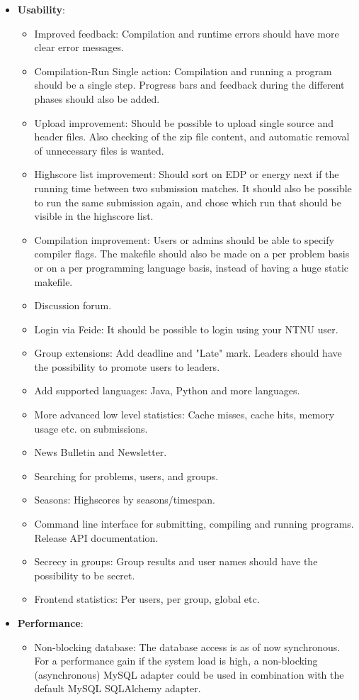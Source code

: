 \begin{itemize}
\item \textbf{Usability}:
    \begin{itemize}
        \item Improved feedback: Compilation and runtime errors should have more clear error messages.
        \item Compilation-Run Single action: Compilation and running a program should be a single step. Progress bars and feedback during the different phases should also be added.
        \item Upload improvement: Should be possible to upload single source and header files. Also checking of the zip file content, and automatic removal of unnecessary files is wanted.
        \item Highscore list improvement: Should sort on EDP or energy next if the running time between two submission matches. It should also be possible to run the same submission again, and chose which run that should be visible in the highscore list.
        \item Compilation improvement: Users or admins should be able to specify compiler flags. The makefile should also be made on a per problem basis or on a per programming language basis, instead of having a huge static makefile.
        \item Discussion forum.
        \item Login via Feide: It should be possible to login using your NTNU user.
        \item Group extensions: Add deadline and "Late" mark. Leaders should have the possibility to promote users to leaders.
        \item Add supported languages: Java, Python and more languages.
        \item More advanced low level statistics: Cache misses, cache hits, memory usage etc. on submissions.
        \item News Bulletin and Newsletter.
        \item Searching for problems, users, and groups.
        \item Seasons: Highscores by seasons/timespan.
        \item Command line interface for submitting, compiling and running programs. Release API documentation.
        \item Secrecy in groups: Group results and user names should have the possibility to be secret.
        \item Frontend statistics: Per users, per group, global etc.
    \end{itemize}
\item \textbf{Performance}:
    \begin{itemize}
      \item Non-blocking database: The database access is as of now synchronous. For a performance gain if the system load is high, a non-blocking (asynchronous) MySQL adapter could be used in combination with the default MySQL SQLAlchemy adapter.
    \end{itemize}
\end{itemize}
